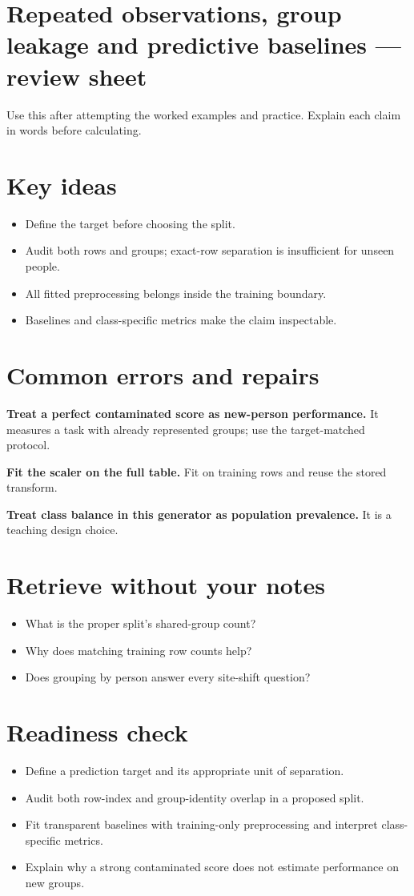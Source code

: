 \documentclass[11pt,letterpaper]{article}
\theoremstyle{definition}\newtheorem{definition}{Definition}\newtheorem{example}{Example}
\numberwithin{equation}{section}
\begin{document}
\section*{Repeated observations, group leakage and predictive baselines --- review sheet}
Use this after attempting the worked examples and practice. Explain each claim in words before calculating.

\section*{Key ideas}
\begin{itemize}
\item Define the target before choosing the split.
\item Audit both rows and groups; exact-row separation is insufficient for unseen people.
\item All fitted preprocessing belongs inside the training boundary.
\item Baselines and class-specific metrics make the claim inspectable.
\end{itemize}
\section*{Common errors and repairs}
\textbf{Treat a perfect contaminated score as new-person performance.} It measures a task with already represented groups; use the target-matched protocol.

\textbf{Fit the scaler on the full table.} Fit on training rows and reuse the stored transform.

\textbf{Treat class balance in this generator as population prevalence.} It is a teaching design choice.

\section*{Retrieve without your notes}
\begin{itemize}
\item What is the proper split's shared-group count?
\item Why does matching training row counts help?
\item Does grouping by person answer every site-shift question?
\end{itemize}
\section*{Readiness check}
\begin{itemize}
\item Define a prediction target and its appropriate unit of separation.
\item Audit both row-index and group-identity overlap in a proposed split.
\item Fit transparent baselines with training-only preprocessing and interpret class-specific metrics.
\item Explain why a strong contaminated score does not estimate performance on new groups.
\end{itemize}
\end{document}
